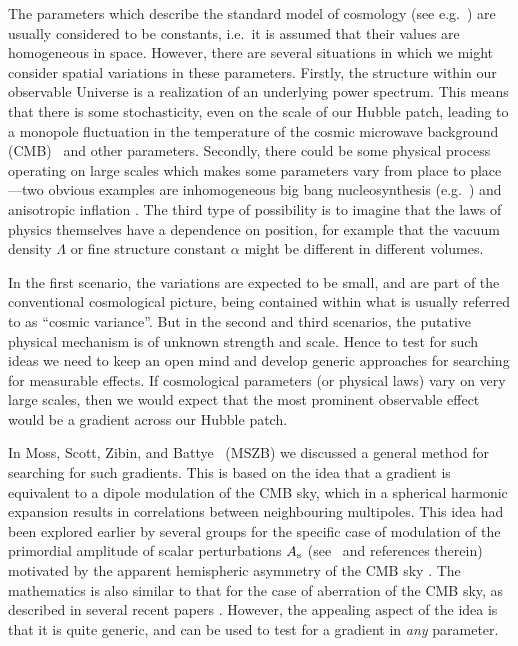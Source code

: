 \documentclass[twocolumn,aps,prd,showpacs]{revtex4}
\begin{document}
The parameters which describe the standard model of cosmology
(see e.g.~\cite{scott06}) are usually considered to be constants,
i.e.\ it is assumed that their values are homogeneous in
space.  However, there are several situations in which we might consider
spatial variations in these parameters.  Firstly, the structure within our
observable Universe is a realization of an underlying power spectrum.  This
means that there is some stochasticity, even on the scale of our Hubble patch,
leading to a monopole fluctuation in the temperature of the cosmic microwave
background (CMB)~\cite{Zibin:2008fe} and other parameters.  Secondly,
there could be some physical process operating on large scales which makes
some parameters vary from place to place---two obvious examples are
inhomogeneous big bang
nucleosynthesis (e.g.~\cite{Harrison}) and anisotropic inflation
\cite{Gordon:2005ai,Ackerman:2007nb,Pullen:2007tu,Gumrukcuoglu:2007bx}.
The third type of possibility is to imagine that the laws of physics
themselves have a dependence on position, for example that the vacuum
density $\Lambda$ or fine structure constant $\alpha$ might be different in
different volumes.

In the first scenario, the variations are expected to be small, and are
part of the conventional cosmological picture, being contained within what
is usually referred to as ``cosmic variance''.  But in the second and
third scenarios, the putative physical mechanism is of unknown strength and
scale.  Hence to test for such ideas we need to keep an open mind and
develop generic approaches for searching for measurable effects.
If cosmological parameters (or physical laws) vary on very large scales,
then we would expect that the most prominent observable effect would be a
gradient across our Hubble patch.

In Moss, Scott, Zibin, and Battye~\cite{Moss:2010} (MSZB) we discussed a 
general method for
searching for such gradients.  This is based on the idea that a gradient
is equivalent to a dipole modulation of the CMB sky, which in a spherical
harmonic expansion results in correlations between neighbouring multipoles.
This idea had been explored earlier by several groups for the specific case
of modulation of the primordial amplitude of scalar perturbations $A_{\rm s}$
(see~\cite{Carroll2010} and references therein)
motivated by the apparent hemispheric asymmetry of the CMB sky
\cite{Eriksen:2003db,Eriksen:2007pc}.
The mathematics is also similar to that for the case of aberration of the
CMB sky, as described in several recent papers
\cite{Kosowsky:2010jm,Amendola:2010ty,Chluba:2011}.
However, the appealing
aspect of the idea is that it is quite generic, and can be used to test
for a gradient in {\it any\/} parameter.
\end{document}
